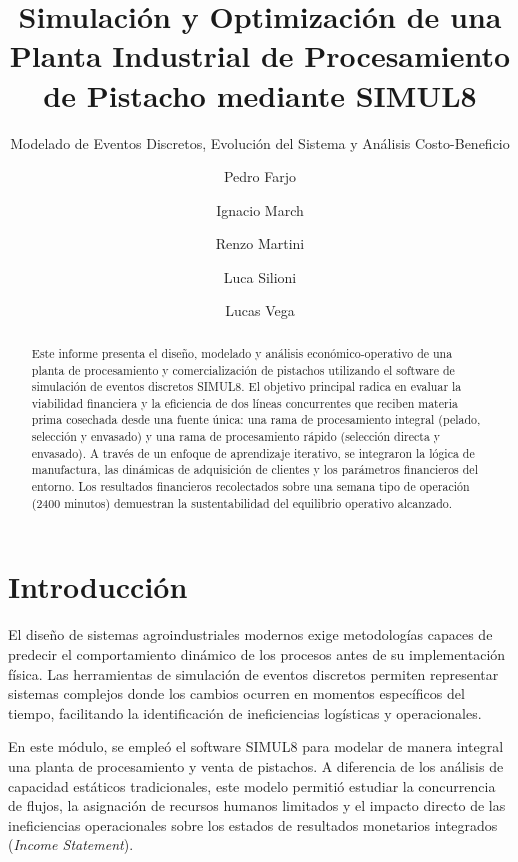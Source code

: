 \documentclass{llncs}
\begin{document}
\title{Simulación y Optimización de una Planta Industrial de Procesamiento de Pistacho mediante SIMUL8}
\subtitle{Modelado de Eventos Discretos, Evolución del Sistema y Análisis Costo-Beneficio}

\author{Pedro Farjo \and Ignacio March \and Renzo Martini \and Luca Silioni \and Lucas Vega} 

\maketitle

\begin{abstract}
Este informe presenta el diseño, modelado y análisis económico-operativo de una planta de procesamiento y comercialización de pistachos utilizando el software de simulación de eventos discretos SIMUL8. El objetivo principal radica en evaluar la viabilidad financiera y la eficiencia de dos líneas concurrentes que reciben materia prima cosechada desde una fuente única: una rama de procesamiento integral (pelado, selección y envasado) y una rama de procesamiento rápido (selección directa y envasado). A través de un enfoque de aprendizaje iterativo, se integraron la lógica de manufactura, las dinámicas de adquisición de clientes y los parámetros financieros del entorno. Los resultados financieros recolectados sobre una semana tipo de operación (2400 minutos) demuestran la sustentabilidad del equilibrio operativo alcanzado.

\end{abstract}

\section{Introducción}
El diseño de sistemas agroindustriales modernos exige metodologías capaces de predecir el comportamiento dinámico de los procesos antes de su implementación física. Las herramientas de simulación de eventos discretos permiten representar sistemas complejos donde los cambios ocurren en momentos específicos del tiempo, facilitando la identificación de ineficiencias logísticas y operacionales. 

En este módulo, se empleó el software SIMUL8 para modelar de manera integral una planta de procesamiento y venta de pistachos. A diferencia de los análisis de capacidad estáticos tradicionales, este modelo permitió estudiar la concurrencia de flujos, la asignación de recursos humanos limitados y el impacto directo de las ineficiencias operacionales sobre los estados de resultados monetarios integrados (\textit{Income Statement}).
\end{document}
